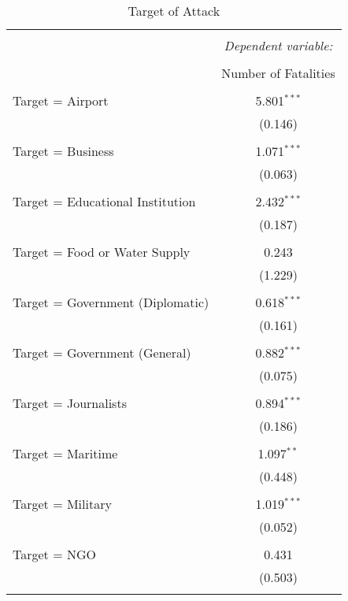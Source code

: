 
\begin{table}[!htbp] \centering 
  \caption{Target of Attack} 
  \label{} 
\begin{tabular}{@{\extracolsep{5pt}}lc} 
\\[-1.8ex]\hline 
\hline \\[-1.8ex] 
 & \multicolumn{1}{c}{\textit{Dependent variable:}} \\ 
\cline{2-2} 
\\[-1.8ex] & Number of Fatalities \\ 
\hline \\[-1.8ex] 
 Target = Airport & 5.801$^{***}$ \\ 
  & (0.146) \\ 
  & \\ 
 Target = Business & 1.071$^{***}$ \\ 
  & (0.063) \\ 
  & \\ 
 Target = Educational Institution & 2.432$^{***}$ \\ 
  & (0.187) \\ 
  & \\ 
 Target = Food or Water Supply & 0.243 \\ 
  & (1.229) \\ 
  & \\ 
 Target = Government (Diplomatic) & 0.618$^{***}$ \\ 
  & (0.161) \\ 
  & \\ 
 Target = Government (General) & 0.882$^{***}$ \\ 
  & (0.075) \\ 
  & \\ 
 Target = Journalists & 0.894$^{***}$ \\ 
  & (0.186) \\ 
  & \\ 
 Target = Maritime & 1.097$^{**}$ \\ 
  & (0.448) \\ 
  & \\ 
 Target = Military & 1.019$^{***}$ \\ 
  & (0.052) \\ 
  & \\ 
 Target = NGO & 0.431 \\ 
  & (0.503) \\ 
  & \\ 

\end{tabular}
\end{table}
